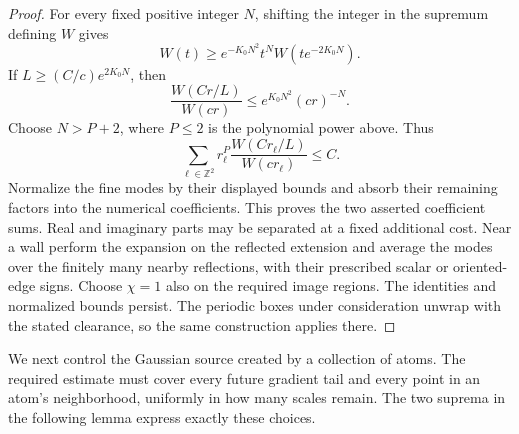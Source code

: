 \begin{proof}
For every fixed positive integer $N$, shifting the integer in the
supremum defining $W$ gives
\[
 W(t)\ge e^{-K_0N^2}t^N W(te^{-2K_0N}).
\]
If $L\ge(C/c)e^{2K_0N}$, then
\[
 \frac{W(Cr/L)}{W(cr)}\le e^{K_0N^2}(cr)^{-N}.
\]
Choose $N>P+2$, where $P\le2$ is the polynomial power above. Thus
\[
 \sum_{\ell\in\mathbb Z^2}
 r_\ell^P\frac{W(Cr_\ell/L)}{W(cr_\ell)}\le C.
\]
Normalize the fine modes by their displayed bounds and absorb
their remaining factors into the numerical coefficients. This
proves the two asserted coefficient sums. Real and imaginary parts
may be separated at a fixed additional cost. Near a wall perform
the expansion on the reflected extension and average the modes
over the finitely many nearby reflections, with their prescribed
scalar or oriented-edge signs. Choose $\chi=1$ also on the required
image regions. The identities and normalized bounds persist.
The periodic boxes under consideration unwrap with the stated
clearance, so the same construction applies there.
\end{proof}

We next control the Gaussian source created by a collection of atoms.
The required estimate must cover every future gradient tail and every
point in an atom's neighborhood, uniformly in how many scales remain.
The two suprema in the following lemma express exactly these choices.


